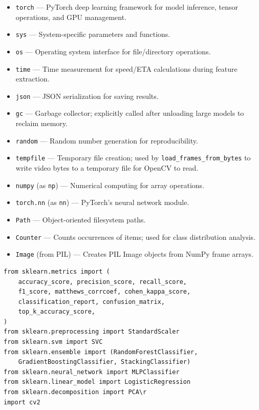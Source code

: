 \begin{explanation}
\begin{itemize}[nosep]
  \item \texttt{torch} --- PyTorch deep learning framework for model inference, tensor operations, and GPU management.
  \item \texttt{sys} --- System-specific parameters and functions.
  \item \texttt{os} --- Operating system interface for file/directory operations.
  \item \texttt{time} --- Time measurement for speed/ETA calculations during feature extraction.
  \item \texttt{json} --- JSON serialization for saving results.
  \item \texttt{gc} --- Garbage collector; explicitly called after unloading large models to reclaim memory.
  \item \texttt{random} --- Random number generation for reproducibility.
  \item \texttt{tempfile} --- Temporary file creation; used by \texttt{load\_frames\_from\_bytes} to write video bytes to a temporary file for OpenCV to read.
  \item \texttt{numpy} (as \texttt{np}) --- Numerical computing for array operations.
  \item \texttt{torch.nn} (as \texttt{nn}) --- PyTorch's neural network module.
  \item \texttt{Path} --- Object-oriented filesystem paths.
  \item \texttt{Counter} --- Counts occurrences of items; used for class distribution analysis.
  \item \texttt{Image} (from PIL) --- Creates PIL Image objects from NumPy frame arrays.
\end{itemize}
\end{explanation}

\begin{lstlisting}
from sklearn.metrics import (
    accuracy_score, precision_score, recall_score,
    f1_score, matthews_corrcoef, cohen_kappa_score,
    classification_report, confusion_matrix,
    top_k_accuracy_score,
)
from sklearn.preprocessing import StandardScaler
from sklearn.svm import SVC
from sklearn.ensemble import (RandomForestClassifier,
    GradientBoostingClassifier, StackingClassifier)
from sklearn.neural_network import MLPClassifier
from sklearn.linear_model import LogisticRegression
from sklearn.decomposition import PCA\r
import cv2
\end{lstlisting}

